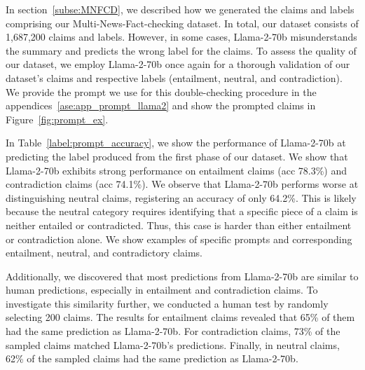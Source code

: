 In section~\ref{subse:MNFCD}, we described how we generated the claims and labels comprising our Multi-News-Fact-checking dataset. In total, our dataset consists of 1,687,200 claims and labels. However, in some cases, Llama-2-70b misunderstands the summary and predicts the wrong label for the claims. To assess the quality of our dataset, we employ Llama-2-70b once again for a thorough validation of our dataset's claims and respective labels (entailment, neutral, and contradiction). We provide the prompt we use for this double-checking procedure in the appendices~\ref{ase:app_prompt_llama2} and show the prompted claims in Figure~\ref{fig:prompt_ex}.

In Table~\ref{label:prompt_accuracy}, we show the performance of Llama-2-70b at predicting the label produced from the first phase of our dataset. We show that Llama-2-70b exhibits strong performance on entailment claims (acc 78.3\%) and contradiction claims (acc 74.1\%). We observe that Llama-2-70b performs worse at distinguishing neutral claims, registering an accuracy of only 64.2\%. This is likely because the neutral category requires identifying that a specific piece of a claim is neither entailed or contradicted. Thus, this case is harder than either entailment or contradiction alone. We show examples of specific prompts and corresponding entailment, neutral, and contradictory claims.

Additionally, we discovered that most predictions from Llama-2-70b are similar to human predictions, especially in entailment and contradiction claims. To investigate this similarity further, we conducted a human test by randomly selecting 200 claims. The results for entailment claims revealed that 65\% of them had the same prediction as Llama-2-70b. For contradiction claims, 73\% of the sampled claims matched Llama-2-70b's predictions. Finally, in neutral claims, 62\% of the sampled claims had the same prediction as Llama-2-70b.

